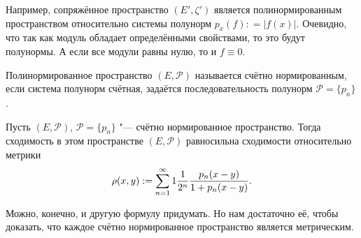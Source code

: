 Например, сопряжённое пространство $(E',\zeta') $ является полинормированным пространством относительно системы полунорм $p_x(f): = \big|f(x)\big|$. Очевидно, что так как модуль обладает определёнными свойствами, то это будут полунормы. А если все модули равны нулю, то и $f\equiv0$.

\begin{Def}
  Полинормированное пространство $(E,\mathcal P)$ называется счётно нормированным, если система полунорм счётная, задаётся последовательность полунорм $\mathcal P = \{p_n\}$.
\end{Def}

\begin{Lem}
  Пусть $(E,\mathcal P)$, $\mathcal P =\{p_n\}$ "--- счётно нормированное пространство. Тогда сходимость в этом пространстве $(E,\mathcal P)$ равносильна сходимости относительно метрики
\[
  \rho(x,y) := \sum\limits_{{n}={1}}^\infty1 \frac1{2^n}\frac{p_n(x-y)}{1+p_n(x-y)}.
\]
\end{Lem}
Можно, конечно, и другую формулу придумать. Но нам достаточно её, чтобы доказать, что каждое счётно нормированное пространство является метрическим.


